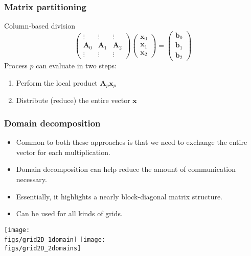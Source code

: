 \begin{frame}
  \frametitle{Matrix partitioning}
  Column-based division
  \[
    \begin{pmatrix}
      \vdots & \vdots & \vdots \\
      \bm A_0 & \bm A_1 & \bm A_2 \\
      \vdots & \vdots & \vdots
    \end{pmatrix}
    \begin{pmatrix}
      \bm x_0 \\ \bm x_1 \\ \bm x_2
    \end{pmatrix}
    =
    \begin{pmatrix}
      \bm b_0 \\ \bm b_1 \\ \bm b_2
    \end{pmatrix}
  \]
  Process $p$ can evaluate in two steps:
  \begin{enumerate}
  \item Perform the local product $\bm A_p \bm x_p$
  \item Distribute (reduce) the entire vector $\bm x$
  \end{enumerate}
\end{frame}

\begin{frame}
  \frametitle{Domain decomposition}
  \begin{itemize}
  \item Common to both these approaches is that we need to exchange the entire
    vector for each multiplication.
  \item Domain decomposition can help reduce the amount of communication
    necessary.
  \item Essentially, it highlights a nearly block-diagonal matrix structure.
  \item Can be used for all kinds of grids.
  \end{itemize}
  \begin{center}
    \texttt{[image: \\figs/grid2D\_1domain]}
    \texttt{[image: \\figs/grid2D\_2domains]}
  \end{center}
\end{frame}


